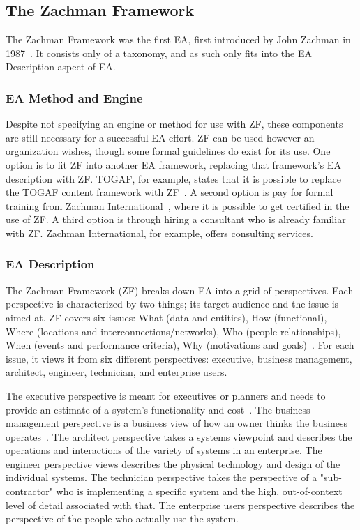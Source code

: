 \subsection{The Zachman Framework}

The Zachman Framework was the first EA, first introduced by John Zachman in 1987~\cite{sessions2007,zachman}. It consists only of a taxonomy, and as such only fits into the EA Description aspect of EA. 

\subsubsection{EA Method and Engine}

Despite not specifying an engine or method for use with ZF, these components are still necessary for a successful EA effort. ZF can be used however an organization wishes, though some formal guidelines do exist for its use. One option is to fit ZF into another EA framework, replacing that framework's EA description with ZF. TOGAF, for example, states that it is possible to replace the TOGAF content framework with ZF~\cite[Ch. 33]{togaf9.1}. A second option is pay for formal training from Zachman International~\cite{zachmanInc}, where it is possible to get certified in the use of ZF. A third option is through hiring a consultant who is already familiar with ZF. Zachman International, for example, offers consulting services.

\subsubsection{EA Description}

The Zachman Framework (ZF) breaks down EA into a grid of perspectives. Each perspective is characterized by two things; its target audience and the issue is aimed at. ZF covers six issues: What (data and entities), How (functional), Where (locations and interconnections/networks), Who (people relationships), When (events and performance criteria), Why (motivations and goals)~\cite{jungle2004}. For each issue, it views it from six different perspectives: executive, business management, architect, engineer, technician, and enterprise users. 

The executive perspective is meant for executives or planners and needs to provide an estimate of a system's functionality and cost~\cite{jungle2004}. The business management perspective is a business view of how an owner thinks the business operates~\cite{Zachman2000}. The architect perspective takes a systems viewpoint and describes the operations and interactions of the variety of systems in an enterprise. The engineer perspective views describes the physical technology and design of the individual systems. The technician perspective takes the perspective of a "sub-contractor" who is implementing a specific system and the high, out-of-context level of detail associated with that. The enterprise users perspective describes the perspective of the people who actually use the system. 
 
